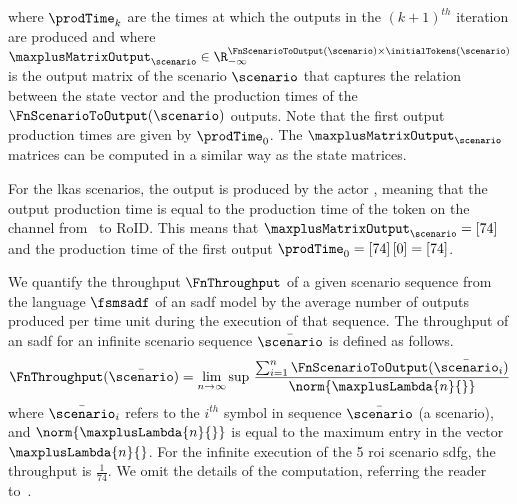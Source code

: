 where $\prodTime_k$ are the times at which the outputs in the $(k+1)^{th}$ iteration are produced and where $\maxplusMatrixOutput_{\scenario} \in \R_{-\infty}^{\FnScenarioToOutput(\scenario) \times \initialTokens(\scenario)}$ is the output matrix of the scenario $\scenario$ that captures the relation between the state vector and the production times of the $\FnScenarioToOutput(\scenario)$ outputs. 
Note that the first output production times are given by $\prodTime_0$. 
The $\maxplusMatrixOutput_{\scenario}$ matrices can be computed in a similar way as the state matrices.

For the \gls{lkas} scenarios, the output is produced by the actor \taskA, meaning that the output production time is equal to the production time of the token on the channel from \taskA\ to RoID. This means that $\maxplusMatrixOutput_{\scenario}=\left[ 74\right]$ and the production time of the first output $\prodTime_0=\left[ 74\right]\left[ 0\right]=\left[ 74\right]$.

We quantify the throughput $\FnThroughput$ of a given scenario sequence from the language $\fsmsadf$ of an \gls{sadf} model by the average number of outputs produced per time unit during the execution of that sequence.
The throughput of an \gls{sadf} for an infinite scenario sequence $\bar{\scenario}$ is defined as follows.
\begin{equation}
\label{eq:ch5_maxplus-throughput}
  \FnThroughput (\bar{\scenario}) = \lim\limits_{n \to \infty} \text{sup } \frac{\sum_{i=1}^{n} \FnScenarioToOutput (\bar\scenario_i)}{\norm{\maxplusLambda{n}{}}}
\end{equation}
where $\bar\scenario_i$ refers to the $i^{th}$ symbol in sequence $\bar\scenario$ (a scenario), and $\norm{\maxplusLambda{n}{}}$ is equal to the maximum entry in the vector $\maxplusLambda{n}{}$.
For the infinite execution of the 5 \gls{roi} scenario \gls{sdfg}, the throughput is $\frac{1}{74}$.
We omit the details of the computation, referring the reader to~\cite{ara2018scalable}.
 
